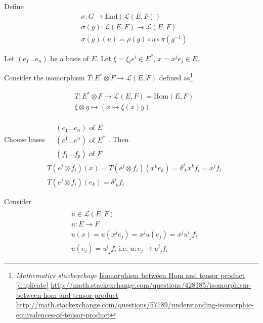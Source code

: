 \documentclass[10pt]{amsart}
\begin{document}
\begin{multicols*}{2}
\begin{enumerate}
Define 
\[
\begin{aligned}
  & \sigma : G \to \text{End}(\mathcal{L}(E,F)) \\ 
  & \sigma(g):\mathcal{L}(E,F) \to \mathcal{L}(E,F) \\  
  & \sigma(g)(u) = \rho(g)\circ u \circ \pi(g^{-1})
\end{aligned}
\]

Let $(e_1 \dots e_n)$ be a basis of $E$.  Let $\xi = \xi_i e^i \in E^*$, $x = x^j e_j \in E$.  

Consider the isomorphism $T: E^*\otimes F \to \mathcal{L}(E,F)$ defined as\footnote{\emph{Mathematics stackexchage} \href{http://math.stackexchange.com/questions/428185/isomorphism-between-hom-and-tensor-product}{Isomorphism between Hom and tensor product [duplicate]} \url{http://math.stackexchange.com/questions/428185/isomorphism-between-hom-and-tensor-product} \\ \url{http://math.stackexchange.com/questions/57189/understanding-isomorphic-equivalences-of-tensor-product}}
 
\[
\begin{aligned}
  & T: E^*\otimes F \to \mathcal{L}(E,F) = \text{Hom}(E,F) \\
  & \xi \otimes y  \mapsto (x \mapsto \xi(x)y)
\end{aligned}
\]

Choose bases $\begin{aligned} & \quad \\
  & (e_1 \dots e_n) \text{ of } E \\
   & (e^1 \dots e^n) \text{ of } E^* \\  
    & (f_1 \dots f_p) \text{ of } F 
\end{aligned}$.  Then
\[
\begin{aligned}
  & T(e^j\otimes f_i)(x) = T(e^j\otimes f_i)(x^ke_k) = \delta^j_{\,\,k} x^k f_i = x^j f_i \\
  & T(e^j\otimes f_i)(e_k) = \delta^j_{\,\,k}f_i
\end{aligned}
\]

Consider 
\[
\begin{aligned} & \quad \\
  & u \in \mathcal{L}(E,F) \\
  & u: E \to F \\
  & u(x) = u(x^je_j) = x^ju(e_j) = x^j u^i_{\,\,j} f_i \\
  & u(e_j) = u^i_{\,\,j}f_i \text{ i.e. } u: e_j \to u^i_{\,\,j}f_i \end{aligned}
\]


\end{enumerate}
\end{multicols*}
\end{document}
